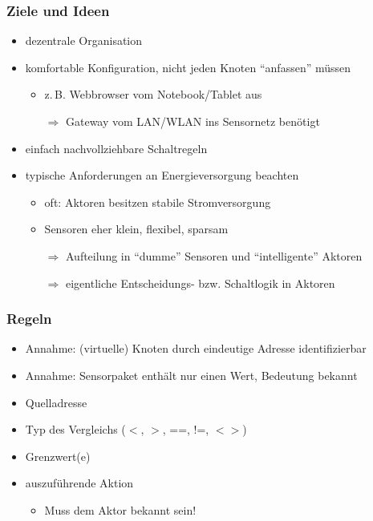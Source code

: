 \documentclass{beamer}
\newcommand{\customitemsep}{7pt}
\newcommand{\customitemsepsub}{2pt}
\begin{document}
\begin{frame}
    \frametitle{Ziele und Ideen}
    
		    \begin{itemize} \setlength{\itemsep}{\customitemsep}
		        \item dezentrale Organisation
		        \item komfortable Konfiguration, nicht jeden Knoten \enquote{anfassen} müssen
		            \begin{itemize} \setlength{\itemsep}{\customitemsepsub}
		                \item z.\,B. Webbrowser vom Notebook/Tablet aus
		                \item[$\Rightarrow$] Gateway vom LAN/WLAN ins Sensornetz benötigt
		            \end{itemize}
		
		        \item einfach nachvollziehbare Schaltregeln
		        \item typische Anforderungen an Energieversorgung beachten
		            \begin{itemize} \setlength{\itemsep}{\customitemsepsub}
		                \item oft: Aktoren besitzen stabile Stromversorgung
		                \item Sensoren eher klein, flexibel, sparsam
		                \item[$\Rightarrow$] Aufteilung in \enquote{dumme} Sensoren und \enquote{intelligente} Aktoren
		                \item[$\Rightarrow$] eigentliche Entscheidungs- bzw. Schaltlogik in Aktoren
		            \end{itemize}
		    \end{itemize}
\end{frame}

\begin{frame}
    \frametitle{Regeln}

    \begin{itemize} \setlength{\itemsep}{\customitemsep}
        \item Annahme: (virtuelle) Knoten durch eindeutige Adresse identifizierbar
        \item Annahme: Sensorpaket enthält nur einen Wert, Bedeutung bekannt
        \item[ ] \vspace*{0.5cm}
            \pause
        \item Quelladresse
        \item Typ des Vergleichs ($<$, $>$, ==, !=, $<>$)
        \item Grenzwert(e)
        \item auszuführende Aktion
            \begin{itemize} \setlength{\itemsep}{\customitemsep}
                \item Muss dem Aktor bekannt sein!
            \end{itemize}
    \end{itemize}
\end{frame}
\end{document}
